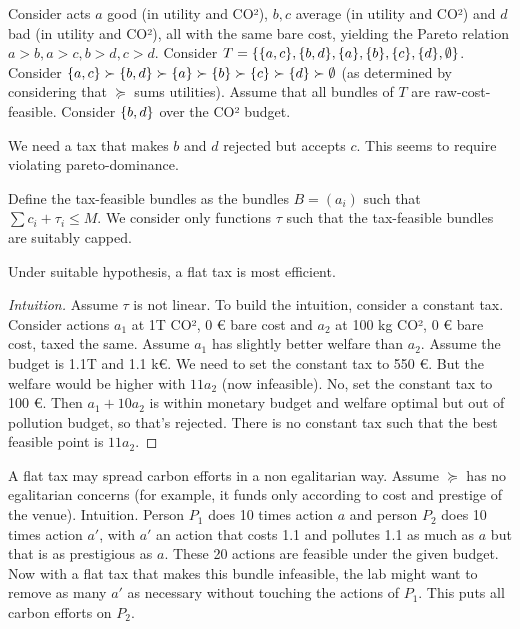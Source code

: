 \documentclass[version=3.21, pagesize, twoside=off, bibliography=totoc, DIV=calc, fontsize=12pt, a4paper, french, english]{scrartcl}
\begin{document}
\begin{example}
	Consider acts $a$ good (in utility and CO²), $b, c$ average (in utility and CO²) and $d$ bad (in utility and CO²), all with the same bare cost, yielding the Pareto relation $a > b, a > c, b > d, c > d$.
	Consider $T = \{\{a, c\}, \{b, d\}, \{a\}, \{b\}, \{c\}, \{d\}, \emptyset\}$. 
	Consider $\{a, c\} \succ \{b, d\} \succ \{a\} \succ \{b\} \succ \{c\} \succ \{d\} \succ \emptyset$ (as determined by considering that $\succeq$ sums utilities).
	Assume that all bundles of $T$ are raw-cost-feasible.
	Consider $\{b, d\}$ over the CO² budget.
	
	We need a tax that makes $b$ and $d$ rejected but accepts $c$.
	This seems to require violating pareto-dominance.
\end{example}

Define the tax-feasible bundles as the bundles $B = (a_i)$ such that $\sum c_i + \tau_i ≤ M$.
We consider only functions $\tau$ such that the tax-feasible bundles are suitably capped.

\begin{theorem}
	Under suitable hypothesis, a flat tax is most efficient.
\end{theorem}
\begin{proof}[Intuition]
	Assume $\tau$ is not linear. To build the intuition, consider a constant tax. Consider actions $a_1$ at 1T CO², 0 € bare cost and $a_2$ at 100 kg CO², 0 € bare cost, taxed the same. Assume $a_1$ has slightly better welfare than $a_2$.
	Assume the budget is 1.1T and 1.1 k€. We need to set the constant tax to 550 €. But the welfare would be higher with $11 a_2$ (now infeasible). No, set the constant tax to 100 €. Then $a_1 + 10 a_2$ is within monetary budget and welfare optimal but out of pollution budget, so that’s rejected. There is no constant tax such that the best feasible point is $11 a_2$.
\end{proof}
		
A flat tax may spread carbon efforts in a non egalitarian way. Assume $\succeq$ has no egalitarian concerns (for example, it funds only according to cost and prestige of the venue).
Intuition. Person $P_1$ does 10 times action $a$ and person $P_2$ does 10 times action $a'$, with $a'$ an action that costs 1.1 and pollutes 1.1 as much as $a$ but that is as prestigious as $a$. These 20 actions are feasible under the given budget. Now with a flat tax that makes this bundle infeasible, the lab might want to remove as many $a'$ as necessary without touching the actions of $P_1$. This puts all carbon efforts on $P_2$.
\end{document}

